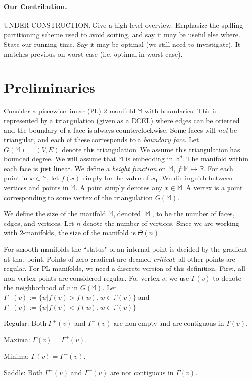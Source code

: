 \documentclass[11pt]{article}
\theoremstyle{definition}
\newcommand{\innbd}{\Gamma^-}
\newcommand{\nbd}{\Gamma}
\newcommand{\outnbd}{\Gamma^+}
\newcommand{\MM}{\mathbb{M}}
\newcommand{\RR}{\mathbb{R}}
\begin{document}
\paragraph{Our Contribution.} UNDER CONSTRUCTION.
Give a high level overview.  Emphasize the spilling partitioning scheme used to avoid sorting, and say it may be useful else where.  State our running time.  Say it may be optimal (we still need to investigate).  It matches previous on worst case (i.e. optimal in worst case).





\section{Preliminaries}
Consider a piecewise-linear (PL) $2$-manifold $\MM$ with boundaries.
This is represented by a triangulation (given as a DCEL) where edges
can be oriented and the boundary of a face is always counterclockwise. Some faces will \emph{not}
be triangular, and each of these corresponds to a \emph{boundary face}.
Let $G(\MM) = (V,E)$ denote this triangulation. We assume this triangulation
has bounded degree.
We will assume that $\MM$ is embedding in $\RR^d$.
The manifold within each face is just linear.
We define a \emph{height function} on $\MM$, $f:\MM \mapsto \RR$. For each point in $x \in \MM$, let $f(x)$ simply be the value of $x_1$.
We distinguish between vertices and points in $\MM$. A point simply denotes any $x \in \MM$. A vertex is a point
corresponding to some vertex of the triangulation $G(\MM)$.

We define the size of the manifold $\MM$, denoted $|\MM|$, to be the number of faces, edges, and vertices.  
Let $n$ denote the number of vertices.  
Since we are working with $2$-manifolds, the size of the manifold is $\Theta(n)$.

For smooth manifolds the ``status" of an internal point is decided by the gradient at that point. 
Points of zero gradient are deemed \emph{critical};
all other points are regular.
For PL manifolds, we need a discrete version of this definition.
First, all non-vertex points are considered regular.
For vertex $v$, we use $\nbd(v)$ to denote the neighborhood of $v$ in $G(\MM)$. Let $\outnbd(v) := \{ w | f(v) > f(w), w \in \Gamma(v)\}$
and $\innbd(v) := \{w | f(v) < f(w), w \in \Gamma(v)\}$. 
\smallskip
\begin{asparaenum}
	\item Regular: Both $\outnbd(v)$ and $\innbd(v)$ are non-empty and are contiguous in $\nbd(v)$.
	\item Maxima: $\nbd(v) = \outnbd(v)$.
	\item Minima: $\nbd(v) = \innbd(v)$.
	\item Saddle: Both $\outnbd(v)$ and $\innbd(v)$ are not contiguous in $\nbd(v)$.
\end{asparaenum}
\smallskip
\end{document}
